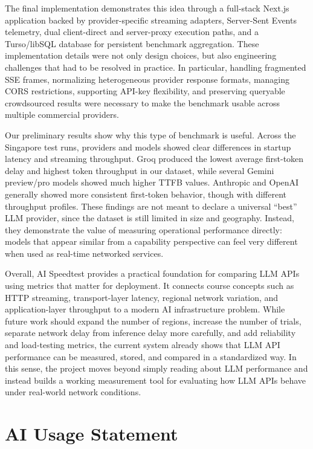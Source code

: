 \documentclass[11pt, a4paper]{article}
\begin{document}
The final implementation demonstrates this idea through a full-stack Next.js application backed by provider-specific streaming adapters, Server-Sent Events telemetry, dual client-direct and server-proxy execution paths, and a Turso/libSQL database for persistent benchmark aggregation. These implementation details were not only design choices, but also engineering challenges that had to be resolved in practice. In particular, handling fragmented SSE frames, normalizing heterogeneous provider response formats, managing CORS restrictions, supporting API-key flexibility, and preserving queryable crowdsourced results were necessary to make the benchmark usable across multiple commercial providers.

Our preliminary results show why this type of benchmark is useful. Across the Singapore test runs, providers and models showed clear differences in startup latency and streaming throughput. Groq produced the lowest average first-token delay and highest token throughput in our dataset, while several Gemini preview/pro models showed much higher TTFB values. Anthropic and OpenAI generally showed more consistent first-token behavior, though with different throughput profiles. These findings are not meant to declare a universal “best” LLM provider, since the dataset is still limited in size and geography. Instead, they demonstrate the value of measuring operational performance directly: models that appear similar from a capability perspective can feel very different when used as real-time networked services.

Overall, AI Speedtest provides a practical foundation for comparing LLM APIs using metrics that matter for deployment. It connects course concepts such as HTTP streaming, transport-layer latency, regional network variation, and application-layer throughput to a modern AI infrastructure problem. While future work should expand the number of regions, increase the number of trials, separate network delay from inference delay more carefully, and add reliability and load-testing metrics, the current system already shows that LLM API performance can be measured, stored, and compared in a standardized way. In this sense, the project moves beyond simply reading about LLM performance and instead builds a working measurement tool for evaluating how LLM APIs behave under real-world network conditions.

\section{AI Usage Statement}
\end{document}
